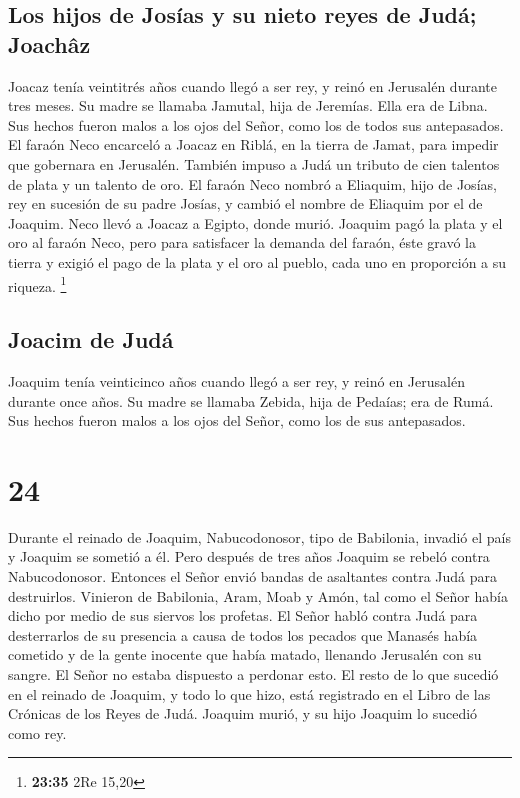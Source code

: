 \hypertarget{los-hijos-de-josuxedas-y-su-nieto-reyes-de-juduxe1-joachuxe2z}{%
\subsection{Los hijos de Josías y su nieto reyes de Judá;
Joachâz}\label{los-hijos-de-josuxedas-y-su-nieto-reyes-de-juduxe1-joachuxe2z}}

 Joacaz tenía veintitrés años cuando llegó a ser rey, y
reinó en Jerusalén durante tres meses. Su madre se llamaba Jamutal, hija
de Jeremías. Ella era de Libna.  Sus hechos fueron malos
a los ojos del Señor, como los de todos sus antepasados. 
El faraón Neco encarceló a Joacaz en Riblá, en la tierra de Jamat, para
impedir que gobernara en Jerusalén. También impuso a Judá un tributo de
cien talentos de plata y un talento de oro.  El faraón
Neco nombró a Eliaquim, hijo de Josías, rey en sucesión de su padre
Josías, y cambió el nombre de Eliaquim por el de Joaquim. Neco llevó a
Joacaz a Egipto, donde murió.  Joaquim pagó la plata y el
oro al faraón Neco, pero para satisfacer la demanda del faraón, éste
gravó la tierra y exigió el pago de la plata y el oro al pueblo, cada
uno en proporción a su riqueza. \footnote{\textbf{23:35} 2Re 15,20}

\hypertarget{joacim-de-juduxe1}{%
\subsection{Joacim de Judá}\label{joacim-de-juduxe1}}

 Joaquim tenía veinticinco años cuando llegó a ser rey, y
reinó en Jerusalén durante once años. Su madre se llamaba Zebida, hija
de Pedaías; era de Rumá.  Sus hechos fueron malos a los
ojos del Señor, como los de sus antepasados.

\hypertarget{section-23}{%
\section{24}\label{section-23}}

 Durante el reinado de Joaquim, Nabucodonosor, tipo de
Babilonia, invadió el país y Joaquim se sometió a él. Pero después de
tres años Joaquim se rebeló contra Nabucodonosor. 
Entonces el Señor envió bandas de asaltantes contra Judá para
destruirlos. Vinieron de Babilonia, Aram, Moab y Amón, tal como el Señor
había dicho por medio de sus siervos los profetas.  El
Señor habló contra Judá para desterrarlos de su presencia a causa de
todos los pecados que Manasés había cometido y de la gente inocente que
había matado,  llenando Jerusalén con su sangre. El Señor
no estaba dispuesto a perdonar esto.  El resto de lo que
sucedió en el reinado de Joaquim, y todo lo que hizo, está registrado en
el Libro de las Crónicas de los Reyes de Judá.  Joaquim
murió, y su hijo Joaquim lo sucedió como rey.

